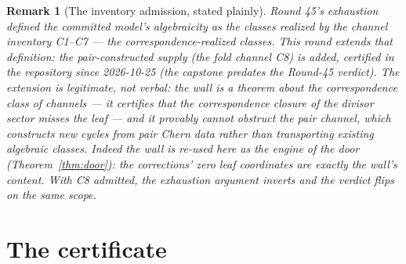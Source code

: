 \documentclass[11pt]{article}
\newtheorem{remark}[theorem]{Remark}
\begin{document}
\begin{remark}[The inventory admission, stated plainly]
Round 45's exhaustion \emph{defined} the committed model's algebraicity as the classes realized
by the channel inventory C1--C7 --- the correspondence-realized classes.  This round
\emph{extends} that definition: the pair-constructed supply (the fold channel C8) is added,
certified in the repository since 2026-10-25 (the capstone predates the Round-45 verdict).  The
extension is legitimate, not verbal: the wall is a theorem about the correspondence class of
channels --- it certifies that the correspondence closure of the divisor sector misses the leaf
--- and it provably cannot obstruct the pair channel, which constructs \emph{new} cycles from
pair Chern data rather than transporting existing algebraic classes.  Indeed the wall is
re-used here as the \emph{engine} of the door (Theorem~\ref{thm:door}): the corrections'
zero leaf coordinates are exactly the wall's content.  With C8 admitted, the exhaustion
argument inverts and the verdict flips \emph{on the same scope}.
\end{remark}

\section{The certificate}
\end{document}

